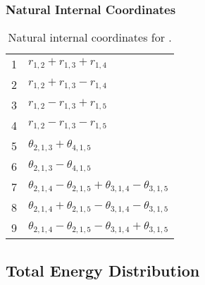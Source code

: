 \documentclass[10pt,oneside]{article}
\begin{document}
\begin{table}[h!]
\subsubsection*{Natural Internal Coordinates}
\centering
\caption{Natural internal coordinates for .}
\small
\begin{tabular}{ll}
\toprule
  1   & $r_{1,2} + r_{1,3} + r_{1,4}$ \\
  2   & $r_{1,2} + r_{1,3} - r_{1,4}$ \\
  3   & $r_{1,2} - r_{1,3} + r_{1,5}$ \\
  4   & $r_{1,2} - r_{1,3} - r_{1,5}$ \\
  5   & $\theta_{2,1,3} + \theta_{4,1,5}$ \\
  6   & $\theta_{2,1,3} - \theta_{4,1,5}$ \\
  7   & $\theta_{2,1,4} - \theta_{2,1,5} + \theta_{3,1,4} - \theta_{3,1,5}$ \\
  8   & $\theta_{2,1,4} + \theta_{2,1,5} - \theta_{3,1,4} - \theta_{3,1,5}$ \\
  9   & $\theta_{2,1,4} - \theta_{2,1,5} - \theta_{3,1,4} + \theta_{3,1,5}$ \\
\bottomrule
\end{tabular}
\end{table}

\begin{table}
\subsection*{Total Energy Distribution}
\centering\end{table}

\clearpage

\subsection{}
\end{document}
